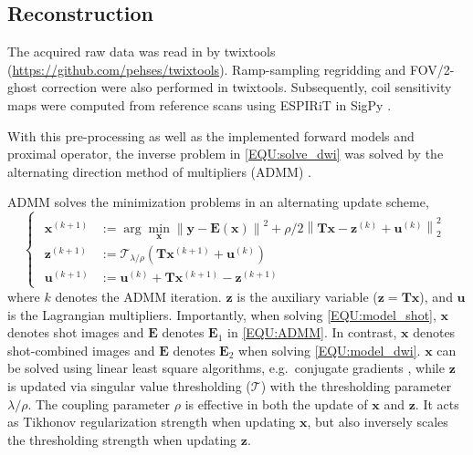 \documentclass[preprint,12pt,authoryear,review]{elsarticle}
\newcommand*{\norm}[1]{\left\lVert#1\right\rVert}
\newcommand{\argmin}{\arg\!\min}
\begin{document}
    \subsection{Reconstruction}

    The acquired raw data was read in by twixtools
    (\url{https://github.com/pehses/twixtools}).
    Ramp-sampling regridding and FOV/2-ghost correction were also performed in twixtools.
    Subsequently, coil sensitivity maps were computed from reference scans
    using ESPIRiT \citep{uecker_2014_espirit} in SigPy \citep{ong_2019_sigpy}.

    With this pre-processing as well as
    the implemented forward models and proximal operator,
    the inverse problem in \cref{EQU:solve_dwi} was solved by
    the alternating direction method of multipliers (ADMM) \citep{boyd_2010_admm}.

    ADMM solves the minimization problems in an alternating update scheme,
    \begin{equation}
        \left\{\begin{matrix}
            \begin{aligned}
                \mathbf{x}^{(k+1)} &:= \argmin_{\mathbf{x}} \norm{\mathbf{y} - \mathbf{E}(\mathbf{x})}^2 + \rho/2 \norm{\mathbf{T}\mathbf{x} - \mathbf{z}^{(k)} + \mathbf{u}^{(k)}}_2^2 \\
                \mathbf{z}^{(k+1)} &:= \mathcal{T}_{\lambda/\rho} (\mathbf{T} \mathbf{x}^{(k+1)} + \mathbf{u}^{(k)}) \\
                \mathbf{u}^{(k+1)} &:= \mathbf{u}^{(k)} + \mathbf{T} \mathbf{x}^{(k+1)} - \mathbf{z}^{(k+1)}
            \end{aligned}
        \end{matrix}\right.
        \label{EQU:ADMM}
    \end{equation}
    where $k$ denotes the ADMM iteration.
    $\mathbf{z}$ is the auxiliary variable ($\mathbf{z} = \mathbf{T}\mathbf{x}$),
    and $\textbf{u}$ is the Lagrangian multipliers.
    Importantly, when solving \cref{EQU:model_shot},
    $\textbf{x}$ denotes shot images and $\mathbf{E}$ denotes $\mathbf{E}_1$ in \cref{EQU:ADMM}.
    In contrast, $\textbf{x}$ denotes shot-combined images and $\mathbf{E}$ denotes $\mathbf{E}_2$
    when solving \cref{EQU:model_dwi}.
    $\mathbf{x}$ can be solved using linear least square algorithms,
    e.g.~conjugate gradients \citep{hestenes_1952_cg},
    while $\mathbf{z}$ is updated via singular value thresholding
    ($\mathcal{T}$) with the thresholding parameter $\lambda / \rho$.
    The coupling parameter $\rho$ is effective in both the update of $\mathbf{x}$ and $\mathbf{z}$.
    It acts as Tikhonov regularization strength when updating $\mathbf{x}$,
    but also inversely scales the thresholding strength when updating $\mathbf{z}$.
\end{document}
